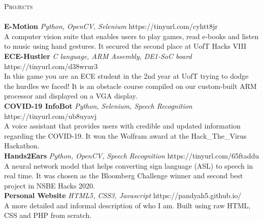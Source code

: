 \documentclass[a4paper]{article}
\newcommand{\lineunder} {
    \vspace*{-8pt} \\
    \hspace*{-18pt} \hrulefill \\
}
\newcommand{\header} [1] {
    {\hspace*{-18pt}\vspace*{6pt} \textsc{#1}}
    \vspace*{-6pt} \lineunder
}
\begin{document}
\header{Projects}
{\textbf{E-Motion}} {\sl Python, OpenCV, Selenium} \hfill https://tinyurl.com/cyhtt8jr\\
A computer vision suite that enables users to play games, read e-books and listen to music using hand gestures. It secured the second place at UofT Hacks VIII\\
\vspace*{2mm}
{\textbf{ECE-Hustler}} {\sl C language, ARM Assembly, DE1-SoC board} \hfill https://tinyurl.com/d38wrur3\\
In this game you are an ECE student in the 2nd year at UofT trying to dodge the hurdles we faced! It is an obstacle course compiled on our custom-built ARM processor and displayed on a VGA display.\\
\vspace*{2mm}
{\textbf{COVID-19 InfoBot}} {\sl Python, Selenium, Speech Recognition} \hfill https://tinyurl.com/ub8uyavj\\
A voice assistant that provides users with credible and updated information regarding the COVID-19. It won the Wolfram award at the Hack\_The\_Virus Hackathon.\\
\vspace*{2mm}
{\textbf{Hands2Ears}} {\sl Python, OpenCV, Speech Recognition} \hfill https://tinyurl.com/65ftaddu\\
A neural network model that helps converting sign language (ASL) to speech in real time. It was chosen as the Bloomberg Challenge winner and second best project in NSBE Hacks 2020.\\
\vspace*{2mm}
{\textbf{Personal Website}} {\sl HTML5, CSS3, Javascript} \hfill https://pandyah5.github.io/\\
A more detailed and informal description of who I am. Built using raw HTML, CSS and PHP from scratch.\\
\end{document}
